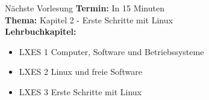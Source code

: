 \documentclass[aspectratio=43]{beamer}
\begin{document}

\begin{frame}[plain]
\begin{alertblock}{Nächste Vorlesung}
\textbf{Termin:} In 15 Minuten\\
\textbf{Thema:} Kapitel 2 - Erste Schritte mit Linux \\
\textbf{Lehrbuchkapitel:} 
\begin{itemize}
\item LXES 1 Computer, Software und Betriebssysteme
\item LXES 2 Linux und freie Software
\item LXES 3 Erste Schritte mit Linux
\end{itemize}
\end{alertblock}
\end{frame}

\materialframe
\end{document}
